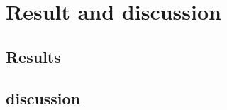 \setcounter{chapter}{3}
\chapter{Result and discussion }
\label{chap:4}
\section{Results}
\section{discussion }

